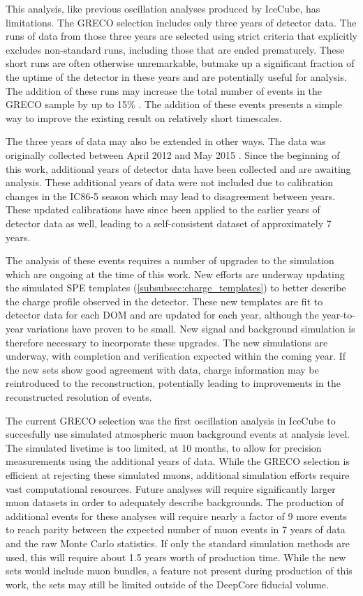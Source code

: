This analysis, like previous oscillation analyses produced by IceCube, has limitations.
The GRECO selection includes only three years of detector data.
The runs of data from those three years are selected using strict criteria that explicitly excludes non-standard runs, including those that are ended prematurely.
These short runs are often otherwise unremarkable, butmake up a significant fraction of the uptime of the detector in these years and are potentially useful for analysis.
The addition of these runs may increase the total number of events in the GRECO sample by up to 15\% .
The addition of these events presents a simple way to improve the existing result on relatively short timescales.

The three years of data may also be extended in other ways.
The data was originally collected between April 2012 and May 2015 .
Since the beginning of this work, additional years of detector data have been collected and are awaiting analysis.
These additional years of data were not included due to calibration changes in the IC86-5 season which may lead to disagreement between years.
These updated calibrations have since been applied to the earlier years of detector data as well, leading to a self-consistent dataset of approximately 7 years.

The analysis of these events requires a number of upgrades to the simulation which are ongoing at the time of this work.
New efforts are underway updating the simulated SPE templates (\ref{subsubsec:charge_templates}) to better describe the charge profile observed in the detector.
These new templates are fit to detector data for each DOM and are updated for each year, although the year-to-year variations have proven to be small.
New signal and background simulation is therefore necessary to incorporate these upgrades.
The new simulations are underway, with completion and verification expected within the coming year.
If the new sets show good agreement with data, charge information may be reintroduced to the reconstruction, potentially leading to improvements in the reconstructed resolution of events.

The current GRECO selection was the first oscillation analysis in IceCube to succesfully use simulated atmospheric muon background events at analysis level.
The simulated livetime is too limited, at 10 months, to allow for precision measurements using the additional years of data.
While the GRECO selection is efficient at rejecting these simulated muons, additional simulation efforts require vast computational resources.
Future analyses will require significantly larger muon datasets in order to adequately describe backgrounds.
The production of additional events for these analyses will require nearly a factor of 9 more events to reach parity between the expected number of muon events in 7 years of data and the raw Monte Carlo statistics.
If only the standard simulation methods are used, this will require about 1.5 years worth of production time.
While the new sets would include muon bundles, a feature not present during production of this work, the sets may still be limited outside of the DeepCore fiducial volume.


